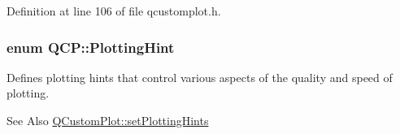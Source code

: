 Definition at line 106 of file qcustomplot.\-h.

\hypertarget{namespace_q_c_p_a5400e5fcb9528d92002ddb938c1f4ef4}{
\subsubsection[{Plotting\-Hint}]{\setlength{\rightskip}{0pt plus 5cm}enum {\bf Q\-C\-P\-::\-Plotting\-Hint}}}\label{namespace_q_c_p_a5400e5fcb9528d92002ddb938c1f4ef4}
Defines plotting hints that control various aspects of the quality and speed of plotting.

\begin{DoxySeeAlso}{See Also}
\hyperlink{class_q_custom_plot_a94a33cbdadbbac5934843508bcfc210d}{Q\-Custom\-Plot\-::set\-Plotting\-Hints} 
\end{DoxySeeAlso}
